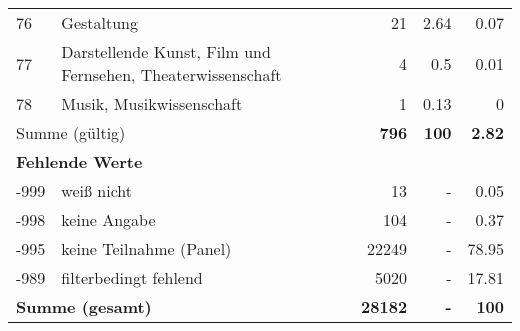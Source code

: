 \begin{longtable}{lXrrr}
        76 & \multicolumn{1}{X}{Gestaltung} & %
          \num{21} &
          \num[round-mode=places,round-precision=2]{2.64} &
          \num[round-mode=places,round-precision=2]{0.07} \\

        77 & \multicolumn{1}{X}{Darstellende Kunst, Film und Fernsehen, Theaterwissenschaft} & %
          \num{4} &
          \num[round-mode=places,round-precision=2]{0.5} &
          \num[round-mode=places,round-precision=2]{0.01} \\

        78 & \multicolumn{1}{X}{Musik, Musikwissenschaft} & %
          \num{1} &
          \num[round-mode=places,round-precision=2]{0.13} &
          \num[round-mode=places,round-precision=2]{0} \\

     \midrule
     \multicolumn{2}{l}{Summe (gültig)} &
       \textbf{\num{796}} &
     \textbf{\num{100}} &
       \textbf{\num[round-mode=places,round-precision=2]{2.82}} \\
     \multicolumn{5}{l}{\textbf{Fehlende Werte}}\\
       -999 &
       weiß nicht &
         \num{13} &
        - &
         \num[round-mode=places,round-precision=2]{0.05} \\
       -998 &
       keine Angabe &
         \num{104} &
        - &
         \num[round-mode=places,round-precision=2]{0.37} \\
       -995 &
       keine Teilnahme (Panel) &
         \num{22249} &
        - &
         \num[round-mode=places,round-precision=2]{78.95} \\
       -989 &
       filterbedingt fehlend &
         \num{5020} &
        - &
         \num[round-mode=places,round-precision=2]{17.81} \\
     \midrule
     \multicolumn{2}{l}{\textbf{Summe (gesamt)}} &
          \textbf{\num{28182}} &
        \textbf{-} &
        \textbf{\num{100}} \\
     \bottomrule
     \end{longtable}
     

